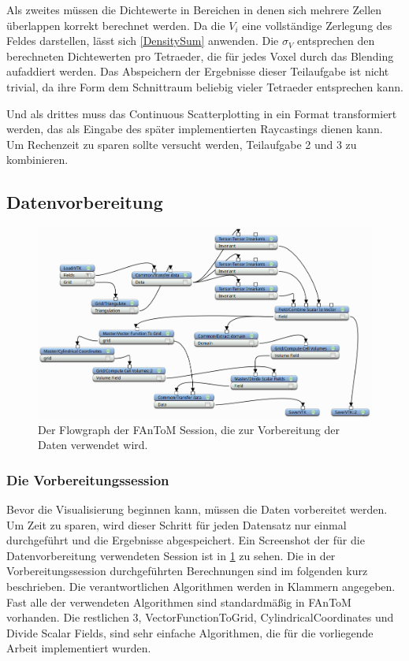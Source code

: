\documentclass[a4paper,fontsize=12pt,toc=bib,parskip=half,ngerman]{scrartcl}
\begin{document}
Als zweites m\"ussen die Dichtewerte in Bereichen in denen sich mehrere Zellen \"uberlappen korrekt berechnet werden. Da die $V_i$ eine vollst\"andige Zerlegung des Feldes darstellen, l\"asst sich \cref{DensitySum} anwenden. Die $\sigma_V$ entsprechen den berechneten Dichtewerten pro Tetraeder, die f\"ur jedes Voxel durch das Blending aufaddiert werden. Das Abspeichern der Ergebnisse dieser Teilaufgabe ist nicht trivial, da ihre Form dem Schnittraum beliebig vieler Tetraeder entsprechen kann.

Und als drittes muss das Continuous Scatterplotting in ein Format transformiert werden, das als Eingabe des sp\"ater implementierten Raycastings dienen kann. Um Rechenzeit zu sparen sollte versucht werden, Teilaufgabe 2 und 3 zu kombinieren.


\subsection{Datenvorbereitung}
\begin{figure}
	\centering
	\includegraphics[width=\textwidth]{pictures/BigSession.png}
	\caption{Der Flowgraph der FAnToM Session, die zur Vorbereitung der Daten verwendet wird.}
	\label{BigSession}
\end{figure}

\subsubsection{Die Vorbereitungssession}
\label{sec:Vorverarbeitung}
Bevor die Visualisierung beginnen kann, m\"ussen die Daten vorbereitet werden. Um Zeit zu sparen, wird dieser Schritt f\"ur jeden Datensatz nur einmal durchgef\"uhrt und die Ergebnisse abgespeichert. Ein Screenshot der f\"ur die Datenvorbereitung verwendeten Session ist in \cref{BigSession} zu sehen. Die in der Vorbereitungssession durchgef\"uhrten Berechnungen sind im folgenden kurz beschrieben. Die verantwortlichen Algorithmen werden in Klammern angegeben. Fast alle der verwendeten Algorithmen sind standardm\"a{\ss}ig in FAnToM vorhanden. Die restlichen 3, \glq VectorFunctionToGrid\grq{}, \glq CylindricalCoordinates\grq{} und \glq Divide Scalar Fields\grq{}, sind sehr einfache Algorithmen, die f\"ur die vorliegende Arbeit implementiert wurden.
\end{document}
